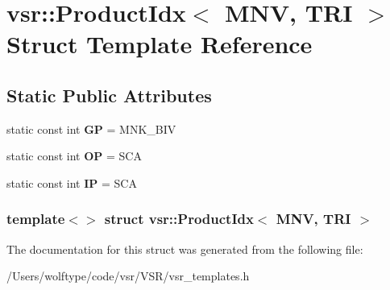 \hypertarget{structvsr_1_1_product_idx_3_01_m_n_v_00_01_t_r_i_01_4}{\section{vsr\-:\-:Product\-Idx$<$ M\-N\-V, T\-R\-I $>$ Struct Template Reference}
\label{structvsr_1_1_product_idx_3_01_m_n_v_00_01_t_r_i_01_4}
}
\subsection*{Static Public Attributes}
\begin{DoxyCompactItemize}
\item 
\hypertarget{structvsr_1_1_product_idx_3_01_m_n_v_00_01_t_r_i_01_4_a874eaf27fb2771fe94774e923d631ea8}{static const int {\bfseries G\-P} = M\-N\-K\-\_\-\-B\-I\-V}\label{structvsr_1_1_product_idx_3_01_m_n_v_00_01_t_r_i_01_4_a874eaf27fb2771fe94774e923d631ea8}

\item 
\hypertarget{structvsr_1_1_product_idx_3_01_m_n_v_00_01_t_r_i_01_4_a6cbc6737b5ec1579bf2bacf522360970}{static const int {\bfseries O\-P} = S\-C\-A}\label{structvsr_1_1_product_idx_3_01_m_n_v_00_01_t_r_i_01_4_a6cbc6737b5ec1579bf2bacf522360970}

\item 
\hypertarget{structvsr_1_1_product_idx_3_01_m_n_v_00_01_t_r_i_01_4_a2fc899a7b40708884bc225699cb410c6}{static const int {\bfseries I\-P} = S\-C\-A}\label{structvsr_1_1_product_idx_3_01_m_n_v_00_01_t_r_i_01_4_a2fc899a7b40708884bc225699cb410c6}

\end{DoxyCompactItemize}
\subsubsection*{template$<$$>$ struct vsr\-::\-Product\-Idx$<$ M\-N\-V, T\-R\-I $>$}



The documentation for this struct was generated from the following file\-:\begin{DoxyCompactItemize}
\item 
/\-Users/wolftype/code/vsr/\-V\-S\-R/vsr\-\_\-templates.\-h\end{DoxyCompactItemize}
